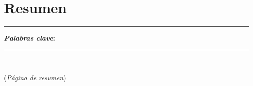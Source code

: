 \chapter*{Resumen} %
\noindent \rule{0.9\textwidth}{1.0pt} \newline
\noindent \textbf{\textit{Palabras clave}: }\newline
\noindent \rule{0.9\textwidth}{1.0pt}
\ \newline
\par
\linespread{1.3}
{\Huge{(\textit{Página de resumen})}}
\clearpage %
